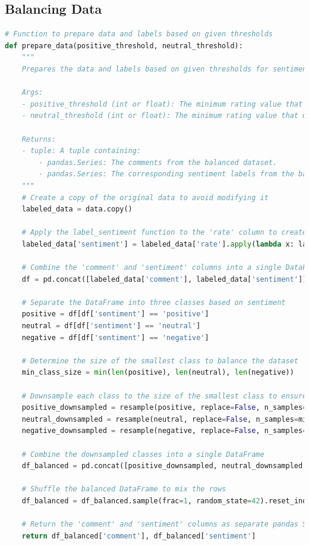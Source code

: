 \documentclass{solutionclass} %
\begin{document}
\subsection*{Balancing Data}


\begin{lstlisting}[language=Python]
	# Function to prepare data and labels based on given thresholds
def prepare_data(positive_threshold, neutral_threshold):
    """
    Prepares the data and labels based on given thresholds for sentiment classification.

    Args:
    - positive_threshold (int or float): The minimum rating value that qualifies as 'positive'.
    - neutral_threshold (int or float): The minimum rating value that qualifies as 'neutral'; ratings below this are considered 'negative'.

    Returns:
    - tuple: A tuple containing:
        - pandas.Series: The comments from the balanced dataset.
        - pandas.Series: The corresponding sentiment labels from the balanced dataset.
    """
    # Create a copy of the original data to avoid modifying it
    labeled_data = data.copy()
    
    # Apply the label_sentiment function to the 'rate' column to create a new 'sentiment' column
    labeled_data['sentiment'] = labeled_data['rate'].apply(lambda x: label_sentiment(x, positive_threshold, neutral_threshold))
    
    # Combine the 'comment' and 'sentiment' columns into a single DataFrame
    df = pd.concat([labeled_data['comment'], labeled_data['sentiment']], axis=1)

    # Separate the DataFrame into three classes based on sentiment
    positive = df[df['sentiment'] == 'positive']
    neutral = df[df['sentiment'] == 'neutral']
    negative = df[df['sentiment'] == 'negative']

    # Determine the size of the smallest class to balance the dataset
    min_class_size = min(len(positive), len(neutral), len(negative))

    # Downsample each class to the size of the smallest class to ensure balance
    positive_downsampled = resample(positive, replace=False, n_samples=min_class_size, random_state=42)
    neutral_downsampled = resample(neutral, replace=False, n_samples=min_class_size, random_state=42)
    negative_downsampled = resample(negative, replace=False, n_samples=min_class_size, random_state=42)

    # Combine the downsampled classes into a single DataFrame
    df_balanced = pd.concat([positive_downsampled, neutral_downsampled, negative_downsampled])

    # Shuffle the balanced DataFrame to mix the rows
    df_balanced = df_balanced.sample(frac=1, random_state=42).reset_index(drop=True)
    
    # Return the 'comment' and 'sentiment' columns as separate pandas Series
    return df_balanced['comment'], df_balanced['sentiment']
\end{lstlisting}
\end{document}
